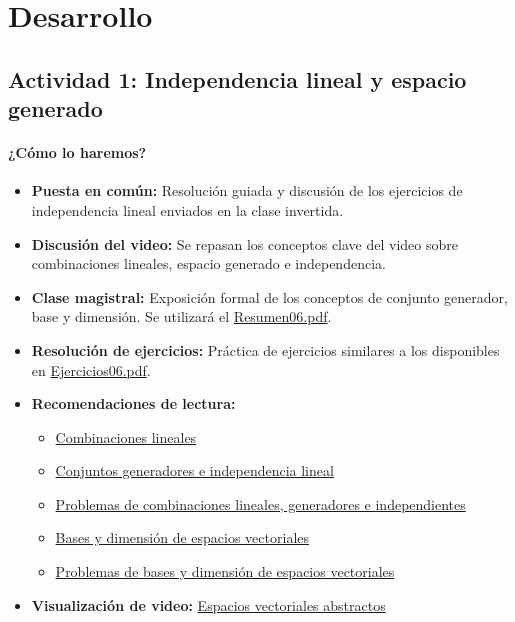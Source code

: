 \documentclass[a4,11pt]{aleph-notas}
\begin{document}
\section*{Desarrollo}

\subsection*{Actividad 1: Independencia lineal y espacio generado}

\paragraph{¿Cómo lo haremos?}  
\begin{itemize}[leftmargin=*]
    \item \textbf{Puesta en común:} Resolución guiada y discusión de los ejercicios de independencia lineal enviados en la clase invertida.
    \item \textbf{Discusión del video:} Se repasan los conceptos clave del video sobre combinaciones lineales, espacio generado e independencia.
    \item \textbf{Clase magistral:} Exposición formal de los conceptos de conjunto generador, base y dimensión. Se utilizará el \href{https://fcena-puce.github.io/AlgLinealyGeomAnalitica-05-N0068/2-Resumenes/Resumen06.pdf}{Resumen06.pdf}.
    \item \textbf{Resolución de ejercicios:} Práctica de ejercicios similares a los disponibles en \href{https://fcena-puce.github.io/AlgLinealyGeomAnalitica-05-N0068/2-Ejercicios/Ejercicios06.pdf}{Ejercicios06.pdf}.
    \item \textbf{Recomendaciones de lectura:} 
    \begin{itemize}
        \item \href{https://blog.nekomath.com/algebra-lineal-i-combinaciones-lineales/}{Combinaciones lineales}
        \item \href{https://blog.nekomath.com/algebra-lineal-i-conjuntos-generadores-independencia-lineal-y-bases/}{Conjuntos generadores e independencia lineal}
        \item \href{https://blog.nekomath.com/algebra-lineal-i-problemas-de-combinaciones-lineales-generadores-e-independientes/}{Problemas de combinaciones lineales, generadores e independientes}
        \item \href{https://blog.nekomath.com/algebra-lineal-i-bases-y-dimension-de-espacios-vectoriales/}{Bases y dimensión de espacios vectoriales}
        \item \href{https://blog.nekomath.com/algebra-lineal-i-problemas-de-bases-y-dimension-de-espacios-vectoriales/}{Problemas de bases y dimensión de espacios vectoriales}
    \end{itemize}
    \item \textbf{Visualización de video:} \href{https://youtu.be/TgKwz5Ikpc8?si=7z5e-PTXFkTK7szh}{Espacios vectoriales abstractos}
\end{itemize}
\end{document}
